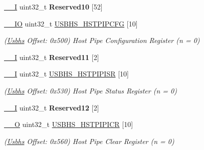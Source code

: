 \begin{DoxyCompactItemize}
\mbox{\label{structUsbhs_af74c71ab1f34fc9284869a44428385f4}} 
\mbox{\hyperlink{core__cm7_8h_af63697ed9952cc71e1225efe205f6cd3}{\+\_\+\+\_\+I}} uint32\+\_\+t {\bfseries Reserved10} \mbox{[}52\mbox{]}
\item 
\mbox{\label{structUsbhs_a879e93de0b90ccb66ab7b67da49e4476}} 
\mbox{\hyperlink{core__cm7_8h_aec43007d9998a0a0e01faede4133d6be}{\+\_\+\+\_\+\+IO}} uint32\+\_\+t \mbox{\hyperlink{structUsbhs_a879e93de0b90ccb66ab7b67da49e4476}{U\+S\+B\+H\+S\+\_\+\+H\+S\+T\+P\+I\+P\+C\+FG}} \mbox{[}10\mbox{]}
\begin{DoxyCompactList}\small\item\em (\mbox{\hyperlink{structUsbhs}{Usbhs}} Offset\+: 0x500) Host Pipe Configuration Register (n = 0) \end{DoxyCompactList}\item 
\mbox{\label{structUsbhs_a94ae14e61d9404ed2ac957f4eae1e3c9}} 
\mbox{\hyperlink{core__cm7_8h_af63697ed9952cc71e1225efe205f6cd3}{\+\_\+\+\_\+I}} uint32\+\_\+t {\bfseries Reserved11} \mbox{[}2\mbox{]}
\item 
\mbox{\label{structUsbhs_aab1d42aa906a50294210beaab96ac0a6}} 
\mbox{\hyperlink{core__cm7_8h_af63697ed9952cc71e1225efe205f6cd3}{\+\_\+\+\_\+I}} uint32\+\_\+t \mbox{\hyperlink{structUsbhs_aab1d42aa906a50294210beaab96ac0a6}{U\+S\+B\+H\+S\+\_\+\+H\+S\+T\+P\+I\+P\+I\+SR}} \mbox{[}10\mbox{]}
\begin{DoxyCompactList}\small\item\em (\mbox{\hyperlink{structUsbhs}{Usbhs}} Offset\+: 0x530) Host Pipe Status Register (n = 0) \end{DoxyCompactList}\item 
\mbox{\label{structUsbhs_a8a0da977dbdbdb01cd7b1b9335f422e6}} 
\mbox{\hyperlink{core__cm7_8h_af63697ed9952cc71e1225efe205f6cd3}{\+\_\+\+\_\+I}} uint32\+\_\+t {\bfseries Reserved12} \mbox{[}2\mbox{]}
\item 
\mbox{\label{structUsbhs_aefd2a2ee814129546440e1b249d921eb}} 
\mbox{\hyperlink{core__cm7_8h_a7e25d9380f9ef903923964322e71f2f6}{\+\_\+\+\_\+O}} uint32\+\_\+t \mbox{\hyperlink{structUsbhs_aefd2a2ee814129546440e1b249d921eb}{U\+S\+B\+H\+S\+\_\+\+H\+S\+T\+P\+I\+P\+I\+CR}} \mbox{[}10\mbox{]}
\begin{DoxyCompactList}\small\item\em (\mbox{\hyperlink{structUsbhs}{Usbhs}} Offset\+: 0x560) Host Pipe Clear Register (n = 0) \end{DoxyCompactList}\item 

\end{DoxyCompactItemize}
